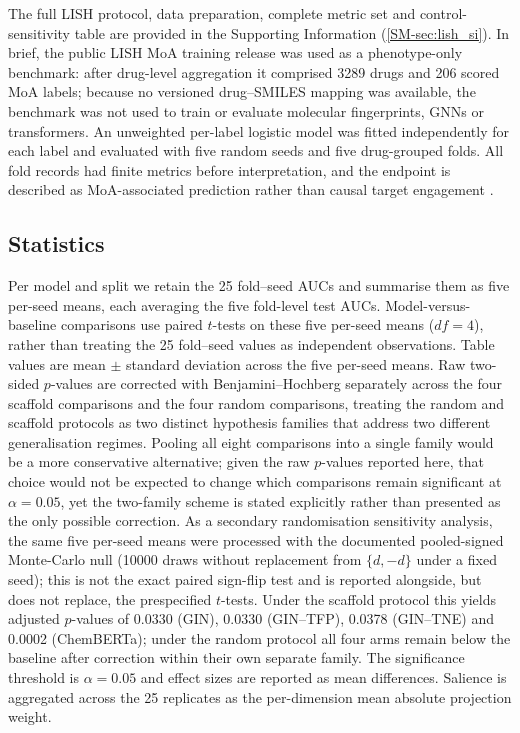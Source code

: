 \documentclass[11pt,a4paper]{article}
\begin{document}
The full LISH protocol, data preparation, complete metric set and control-sensitivity table are provided in the Supporting Information (\cref{SM-sec:lish_si}). In brief, the public LISH MoA training release was used as a phenotype-only benchmark: after drug-level aggregation it comprised \num{3289} drugs and \num{206} scored MoA labels; because no versioned drug--SMILES mapping was available, the benchmark was not used to train or evaluate molecular fingerprints, GNNs or transformers. An unweighted per-label logistic model was fitted independently for each label and evaluated with five random seeds and five drug-grouped folds. All fold records had finite metrics before interpretation, and the endpoint is described as MoA-associated prediction rather than causal target engagement \citep{Trapotsi2022MoA}.

\subsection{Statistics}

Per model and split we retain the \num{25} fold--seed AUCs and summarise them as five per-seed means, each averaging the five fold-level test AUCs. Model-versus-baseline comparisons use paired $t$-tests on these five per-seed means ($df=4$), rather than treating the \num{25} fold--seed values as independent observations. Table values are mean $\pm$ standard deviation across the five per-seed means. Raw two-sided $p$-values are corrected with Benjamini--Hochberg separately across the four scaffold comparisons and the four random comparisons, treating the random and scaffold protocols as two distinct hypothesis families that address two different generalisation regimes. Pooling all eight comparisons into a single family would be a more conservative alternative; given the raw $p$-values reported here, that choice would not be expected to change which comparisons remain significant at $\alpha=0.05$, yet the two-family scheme is stated explicitly rather than presented as the only possible correction. As a secondary randomisation sensitivity analysis, the same five per-seed means were processed with the documented pooled-signed Monte-Carlo null (\num{10000} draws without replacement from $\{d,-d\}$ under a fixed seed); this is not the exact paired sign-flip test and is reported alongside, but does not replace, the prespecified $t$-tests. Under the scaffold protocol this yields adjusted $p$-values of \num{0.0330} (GIN), \num{0.0330} (GIN--TFP), \num{0.0378} (GIN--TNE) and \num{0.0002} (ChemBERTa); under the random protocol all four arms remain below the baseline after correction within their own separate family. The significance threshold is $\alpha=\num{0.05}$ and effect sizes are reported as mean differences. Salience is aggregated across the \num{25} replicates as the per-dimension mean absolute projection weight.
\end{document}

